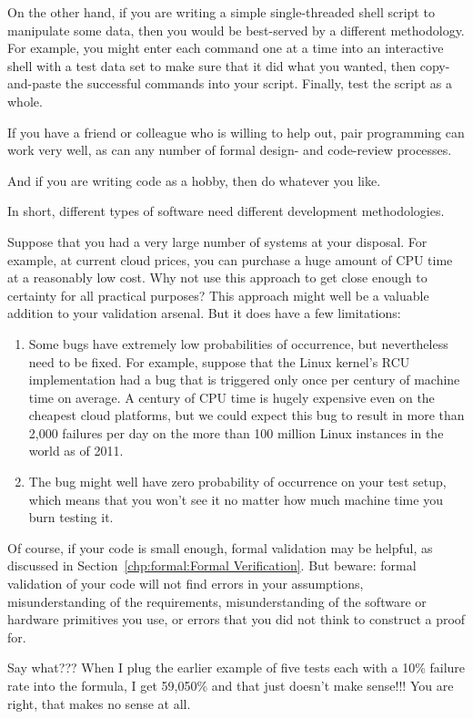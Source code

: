 \begin{enumerate}
	On the other hand, if you are writing a simple single-threaded
	shell script to manipulate some data, then you would be
	best-served by a different methodology.
	For example, you might enter each command one at a time
	into an interactive shell with a test data set to make
	sure that it did what you wanted, then copy-and-paste the
	successful commands into your script.
	Finally, test the script as a whole.

	If you have a friend or colleague who is willing to help out,
	pair programming can work very well, as can any number of
	formal design- and code-review processes.

	And if you are writing code as a hobby, then do whatever you like.

	In short, different types of software need different development
	methodologies.

\QuickQ{}
	Suppose that you had a very large number of systems at your
	disposal.
	For example, at current cloud prices, you can purchase a
	huge amount of CPU time at a reasonably low cost.
	Why not use this approach to get close enough to certainty
	for all practical purposes?
\QuickA{}
	This approach might well be a valuable addition to your
	validation arsenal.
	But it does have a few limitations:
	\begin{enumerate}
	\item	Some bugs have extremely low probabilities of occurrence,
		but nevertheless need to be fixed.
		For example, suppose that the Linux kernel's RCU
		implementation had a bug that is triggered only once
		per century of machine time on average.
		A century of CPU time is hugely expensive even on
		the cheapest cloud platforms, but we could expect
		this bug to result in more than 2,000 failures per day
		on the more than 100 million Linux instances in the
		world as of 2011.
	\item	The bug might well have zero probability of occurrence
		on your test setup, which means that you won't see it
		no matter how much machine time you burn testing it.
	\end{enumerate}
	Of course, if your code is small enough, formal validation
	may be helpful, as discussed in
	Section~\ref{chp:formal:Formal Verification}.
	But beware: formal validation of your code will not find
	errors in your assumptions, misunderstanding of the
	requirements, misunderstanding of the software or hardware
	primitives you use, or errors that you did not think to construct
	a proof for.

\QuickQ{}
	Say what???
	When I plug the earlier example of five tests each with a
	10\% failure rate into the formula, I get 59,050\% and that
	just doesn't make sense!!!
\QuickA{}
	You are right, that makes no sense at all.


\end{enumerate}
